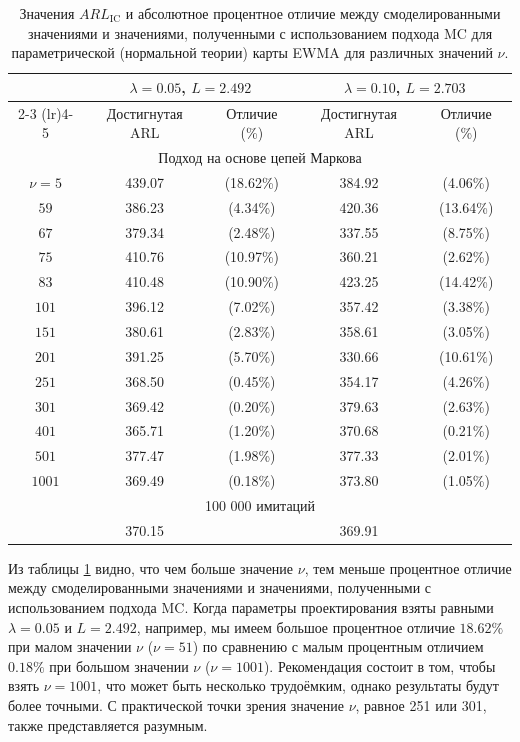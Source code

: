 \begin{table}[htbp]
\centering
\caption{Значения \(ARL_{\text{IC}}\) и абсолютное процентное отличие между смоделированными значениями и значениями, полученными с использованием подхода MC для параметрической (нормальной теории) карты EWMA для различных значений \(\nu\).}
\label{tab:3.12}
\renewcommand{\arraystretch}{1.1}
\begin{tabular}{c cc cc}
\toprule
\multirow{2}{*}{} & \multicolumn{2}{c}{\(\lambda = 0.05\), \(L = 2.492\)} & \multicolumn{2}{c}{\(\lambda = 0.10\), \(L = 2.703\)} \\
\cmidrule(lr){2-3} \cmidrule(lr){4-5}
& Достигнутая ARL & Отличие (\%) & Достигнутая ARL & Отличие (\%) \\
\midrule
\multicolumn{5}{c}{Подход на основе цепей Маркова} \\
\midrule
\(\nu = 5\)   & 439.07 & (18.62\%) & 384.92 & (4.06\%) \\
\(59\)       & 386.23 & (4.34\%)  & 420.36 & (13.64\%) \\
\(67\)       & 379.34 & (2.48\%)  & 337.55 & (8.75\%) \\
\(75\)       & 410.76 & (10.97\%) & 360.21 & (2.62\%) \\
\(83\)       & 410.48 & (10.90\%) & 423.25 & (14.42\%) \\
\(101\)      & 396.12 & (7.02\%)  & 357.42 & (3.38\%) \\
\(151\)      & 380.61 & (2.83\%)  & 358.61 & (3.05\%) \\
\(201\)      & 391.25 & (5.70\%)  & 330.66 & (10.61\%) \\
\(251\)      & 368.50 & (0.45\%)  & 354.17 & (4.26\%) \\
\(301\)      & 369.42 & (0.20\%)  & 379.63 & (2.63\%) \\
\(401\)      & 365.71 & (1.20\%)  & 370.68 & (0.21\%) \\
\(501\)      & 377.47 & (1.98\%)  & 377.33 & (2.01\%) \\
\(1001\)     & 369.49 & (0.18\%)  & 373.80 & (1.05\%) \\
\midrule
\multicolumn{5}{c}{100 000 имитаций} \\
\midrule
& 370.15 & & 369.91 & \\
\bottomrule
\end{tabular}
\end{table}

Из таблицы \ref{tab:3.12} видно, что чем больше значение \(\nu\), тем меньше процентное отличие между смоделированными значениями и значениями, полученными с использованием подхода MC. Когда параметры проектирования взяты равными \(\lambda = 0.05\) и \(L = 2.492\), например, мы имеем большое процентное отличие \(18.62\%\) при малом значении \(\nu\) (\(\nu = 51\)) по сравнению с малым процентным отличием \(0.18\%\) при большом значении \(\nu\) (\(\nu = 1001\)). Рекомендация состоит в том, чтобы взять \(\nu = 1001\), что может быть несколько трудоёмким, однако результаты будут более точными. С практической точки зрения значение \(\nu\), равное 251 или 301, также представляется разумным.

